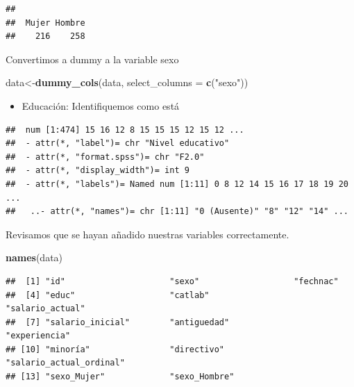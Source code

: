 \documentclass[
]{article}
\newenvironment{Shaded}{\begin{snugshade}}{\end{snugshade}}
\newcommand{\AttributeTok}[1]{\textcolor[rgb]{0.13,0.29,0.53}{#1}}
\newcommand{\FunctionTok}[1]{\textcolor[rgb]{0.13,0.29,0.53}{\textbf{#1}}}
\newcommand{\NormalTok}[1]{#1}
\newcommand{\OtherTok}[1]{\textcolor[rgb]{0.56,0.35,0.01}{#1}}
\newcommand{\SpecialCharTok}[1]{\textcolor[rgb]{0.81,0.36,0.00}{\textbf{#1}}}
\newcommand{\StringTok}[1]{\textcolor[rgb]{0.31,0.60,0.02}{#1}}
\providecommand{\tightlist}{%
  \setlength{\itemsep}{0pt}\setlength{\parskip}{0pt}}
\begin{document}
\begin{verbatim}
## 
##  Mujer Hombre 
##    216    258
\end{verbatim}

Convertimos a dummy a la variable sexo

\begin{Shaded}
\begin{Highlighting}[]
\NormalTok{data}\OtherTok{\textless{}{-}}\FunctionTok{dummy\_cols}\NormalTok{(data, }\AttributeTok{select\_columns =} \FunctionTok{c}\NormalTok{(}\StringTok{"sexo"}\NormalTok{))}
\end{Highlighting}
\end{Shaded}

\begin{itemize}
\tightlist
\item
  Educación: Identifiquemos como está
\end{itemize}

\begin{Shaded}
\end{Shaded}

\begin{verbatim}
##  num [1:474] 15 16 12 8 15 15 15 12 15 12 ...
##  - attr(*, "label")= chr "Nivel educativo"
##  - attr(*, "format.spss")= chr "F2.0"
##  - attr(*, "display_width")= int 9
##  - attr(*, "labels")= Named num [1:11] 0 8 12 14 15 16 17 18 19 20 ...
##   ..- attr(*, "names")= chr [1:11] "0 (Ausente)" "8" "12" "14" ...
\end{verbatim}

Revisamos que se hayan añadido nuestras variables correctamente.

\begin{Shaded}
\begin{Highlighting}[]
\FunctionTok{names}\NormalTok{(data)}
\end{Highlighting}
\end{Shaded}

\begin{verbatim}
##  [1] "id"                     "sexo"                   "fechnac"               
##  [4] "educ"                   "catlab"                 "salario_actual"        
##  [7] "salario_inicial"        "antiguedad"             "experiencia"           
## [10] "minoría"                "directivo"              "salario_actual_ordinal"
## [13] "sexo_Mujer"             "sexo_Hombre"
\end{verbatim}
\end{document}
